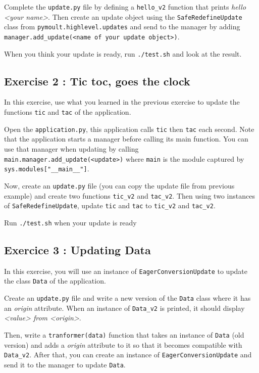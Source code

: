 \documentclass{article}
\begin{document}
Complete the \texttt{update.py} file by defining a
\texttt{hello\_v2} function that prints \textit{hello <your
  name>}. Then create an update object using the
\texttt{SafeRedefineUpdate} class from
\texttt{pymoult.highlevel.updates} and send to the manager by adding
\texttt{manager.add\_update(<name of your update object>)}. 

When you think your update is ready, run \texttt{./test.sh} and look
at the result.


\subsection{Exercise 2 : Tic toc, goes the clock}

In this exercise, use what you learned in the previous exercise to
update the functions \texttt{tic} and \texttt{tac} of the
application.

Open the \texttt{application.py}, this application calls
\texttt{tic} then \texttt{tac} each second. Note that the
application starts a manager before calling its main function. You can
use that manager when updating by calling
\texttt{main.manager.add\_update(<update>)} where \texttt{main}
is the module captured by \texttt{sys.modules["\_\_main\_\_"]}.

Now, create an \texttt{update.py} file (you can copy the update file
from previous example) and create two functions \texttt{tic\_v2} and
\texttt{tac\_v2}. Then using two instances of
\texttt{SafeRedefineUpdate}, update \texttt{tic} and
\texttt{tac} to \texttt{tic\_v2} and \texttt{tac\_v2}.

Run \texttt{./test.sh} when your update is ready

\subsection{Exercice 3 : Updating Data}

In this exercise, you will use an instance of
\texttt{EagerConversionUpdate} to update the class \texttt{Data} of
the application.

Create an \texttt{update.py} file and write a new version of the
\texttt{Data} class where it has an \textit{origin} attribute. When an
instance of \texttt{Data\_v2} is printed, it should display
\textit{<value> from <origin>}.

Then, write a \texttt{tranformer(data)} function that takes an
instance of \texttt{Data} (old version) and adds a \textit{origin}
attribute to it so that it becomes compatible with
\texttt{Data\_v2}. After that, you can create an instance of
\texttt{EagerConversionUpdate} and send it to the manager to update
\texttt{Data}.
\end{document}

